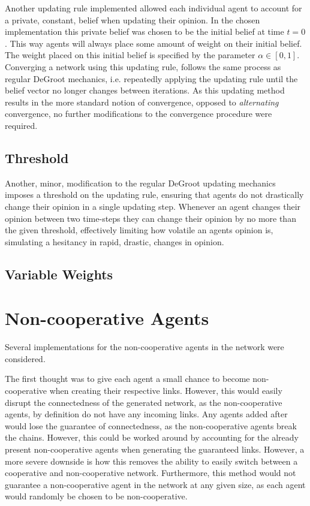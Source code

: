 \documentclass{article}
\begin{document}
Another updating rule implemented allowed each individual agent to account for a private, constant, belief when updating their opinion. In the chosen implementation this private belief was chosen to be the initial belief at time $t=0$. This way agents will always place some amount of weight on their initial belief. The weight placed on this initial belief is specified by the parameter $\alpha \in [0, 1]$. Converging a network using this updating rule, follows the same process as regular DeGroot mechanics, i.e. repeatedly applying the updating rule until the belief vector no longer changes between iterations. As this updating method results in the more standard notion of convergence, opposed to \textit{alternating} convergence, no further modifications to the convergence procedure were required.

\subsection{Threshold}

Another, minor, modification to the regular DeGroot updating mechanics imposes a threshold on the updating rule, ensuring that agents do not drastically change their opinion in a single updating step. Whenever an agent changes their opinion between two time-steps they can change their opinion by no more than the given threshold, effectively limiting how volatile an agents opinion is, simulating a hesitancy in rapid, drastic, changes in opinion.

\subsection{Variable Weights}

\section{Non-cooperative Agents}

Several implementations for the non-cooperative agents in the network were considered.

The first thought was to give each agent a small chance to become non-cooperative when creating their respective links. However, this would easily disrupt the connectedness of the generated network, as the non-cooperative agents, by definition do not have any incoming links. Any agents added after would lose the guarantee of connectedness, as the non-cooperative agents break the chains. However, this could be worked around by accounting for the already present non-cooperative agents when generating the guaranteed links. However, a more severe downside is how this removes the ability to easily switch between a cooperative and non-cooperative network. Furthermore, this method would not guarantee a non-cooperative agent in the network at any given size, as each agent would randomly be chosen to be non-cooperative.
\end{document}
